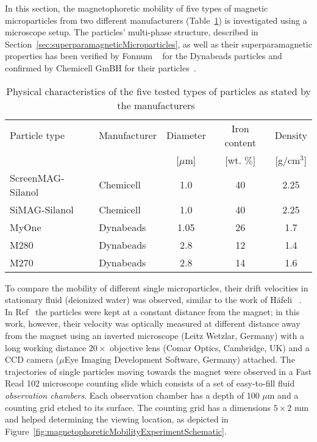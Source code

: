 In this section, the magnetophoretic mobility of five types of magnetic microparticles from two different manufacturers (Table~\ref{tab:particleType}) is investigated using a microscope setup. The particles' multi-phase structure, described in Section~\ref{sec:superparamagneticMicroparticles}, as well as their superparamagnetic properties has been verified by Fonnum \etal~\cite{Fonnum2005} for the Dynabeads particles and confirmed by Chemicell GmBH for their particles~\cite{chemicellConversation}.

\begin{table}[htb]
\begin{center}
\caption[Physical characteristics of the five tested particle types]{Physical characteristics of the five tested types of particles as stated by the manufacturers~\cite{chemicellConversation,dynabeads2015}}\vspace{1ex}
\label{tab:particleType}
\begin{tabular}{llccc}\hline
Particle type 			& Manufacturer 	& Diameter  	& Iron content 	& Density   \\ 
						& 				& [$\mu$m] 		& [wt. $\%$]	& [g/cm$^3$] \\
\hline
ScreenMAG-Silanol 		& Chemicell 	& 1.0 			& 40 			& 2.25  \\
SiMAG-Silanol 			& Chemicell 	& 1.0 			& 40 			& 2.25 \\
MyOne 					& Dynabeads 	& 1.05 			& 26 			& 1.7 \\
M280 					& Dynabeads 	& 2.8 			& 12 			& 1.4 \\
M270 					& Dynabeads 	& 2.8 			& 14 			& 1.6 \\ \hline
\end{tabular}
\end{center}
\end{table}

To compare the mobility of different single microparticles, their drift velocities in stationary fluid (deionized water) was observed, similar to the work of H\"{a}feli \etal~\cite{Haefeli2013}. In Ref~\cite{Haefeli2013} the particles were kept at a constant distance from the magnet; in this work, however, their velocity was optically measured at different distance away from the magnet using an inverted microscope (Leitz Wetzlar, Germany) with a long working distance $20\times$ objective lens (Comar Optics, Cambridge, UK) and a CCD camera ($\mu$Eye Imaging Development Software, Germany) attached. The trajectories of single particles moving towards the magnet were observed in a Fast Read 102 microscope counting slide which consists of a set of easy-to-fill fluid \textit{observation chambers}. Each observation chamber has a depth of 100 $\mu$m and a counting grid etched to its surface. The counting grid has a dimensions $5 \times 2$ mm and helped determining the viewing location, as depicted in Figure~\ref{fig:magnetophoreticMobilityExperimentSchematic}.

